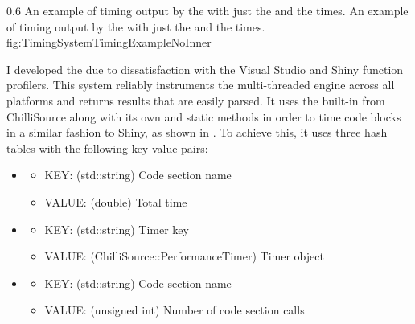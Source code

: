 {0.6}
{An example of timing output by the  with just the  and the  times.}
{An example of timing output by the  with just the  and the  times.}
{fig:TimingSystemTimingExampleNoInner}

I developed the  due to dissatisfaction with the Visual Studio and Shiny function profilers. This system reliably instruments the multi-threaded engine across all platforms and returns results that are easily parsed. It uses the built-in  from ChilliSource along with its own  and  static methods in order to time code blocks in a similar fashion to Shiny, as shown in . To achieve this, it uses three hash tables\footnotemark $ $ with the following key-value pairs:


\begin{singlespace}

	\begin{itemize}[nolistsep,topsep=0pt]
	\itemsep1.0em

		\item {}
			\begin{itemize}[nolistsep,topsep=0pt]
				\item KEY:  (std::string) Code section name
				\item VALUE: (double) Total time
			\end{itemize}

		\item {}
			\begin{itemize}[nolistsep,topsep=0pt]
				\item KEY:  (std::string) Timer key
				\item VALUE: (ChilliSource::PerformanceTimer) Timer object
			\end{itemize}

		\item {}
			\begin{itemize}[nolistsep,topsep=0pt]
				\item KEY:  (std::string) Code section name
				\item VALUE: (unsigned int) Number of code section calls
			\end{itemize}

	\end{itemize}

\end{singlespace}

